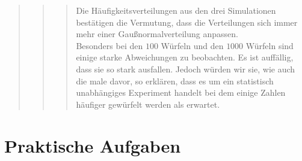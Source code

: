 \begin{quote}
\begin{quote}
\begin{quote}
                Die Häufigkeitsverteilungen aus den drei Simulationen bestätigen die Vermutung, dass die Verteilungen
                sich immer mehr einer Gaußnormalverteilung anpassen.\\
                Besonders bei den $100$ Würfeln und den $1000$ Würfeln sind einige starke Abweichungen zu beobachten. Es
                ist auffällig, dass sie so stark ausfallen. Jedoch würden wir sie, wie auch die male davor, so erklären,
                dass es um ein statistisch unabhängiges Experiment handelt bei dem einige Zahlen häufiger gewürfelt
                werden als erwartet.
		\end{quote}
    \end{quote}
\end{quote}
           
\section{Praktische Aufgaben}
